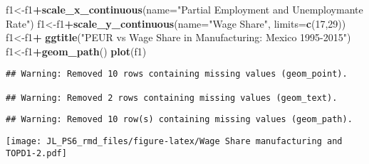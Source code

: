 \documentclass[
]{article}
\newenvironment{Shaded}{\begin{snugshade}}{\end{snugshade}}
\newcommand{\DataTypeTok}[1]{\textcolor[rgb]{0.13,0.29,0.53}{#1}}
\newcommand{\DecValTok}[1]{\textcolor[rgb]{0.00,0.00,0.81}{#1}}
\newcommand{\FloatTok}[1]{\textcolor[rgb]{0.00,0.00,0.81}{#1}}
\newcommand{\KeywordTok}[1]{\textcolor[rgb]{0.13,0.29,0.53}{\textbf{#1}}}
\newcommand{\NormalTok}[1]{#1}
\newcommand{\OperatorTok}[1]{\textcolor[rgb]{0.81,0.36,0.00}{\textbf{#1}}}
\newcommand{\StringTok}[1]{\textcolor[rgb]{0.31,0.60,0.02}{#1}}
\begin{document}
\begin{Shaded}
\begin{Highlighting}[]
\NormalTok{f1<-f1}\OperatorTok{+}\KeywordTok{scale_x_continuous}\NormalTok{(}\DataTypeTok{name=}\StringTok{"Partial Employment and Unemploymante Rate"}\NormalTok{)}
\NormalTok{f1<-f1}\OperatorTok{+}\KeywordTok{scale_y_continuous}\NormalTok{(}\DataTypeTok{name=}\StringTok{"Wage Share"}\NormalTok{, }\DataTypeTok{limits=}\KeywordTok{c}\NormalTok{(}\DecValTok{17}\NormalTok{,}\DecValTok{29}\NormalTok{))}
\NormalTok{f1<-f1}\OperatorTok{+}\StringTok{ }\KeywordTok{ggtitle}\NormalTok{(}\StringTok{"PEUR vs Wage Share in Manufacturing: Mexico 1995-2015"}\NormalTok{)}
\NormalTok{f1<-f1}\OperatorTok{+}\KeywordTok{geom_path}\NormalTok{()}
\KeywordTok{plot}\NormalTok{(f1)}
\end{Highlighting}
\end{Shaded}

\begin{verbatim}
## Warning: Removed 10 rows containing missing values (geom_point).

## Warning: Removed 2 rows containing missing values (geom_text).
\end{verbatim}

\begin{verbatim}
## Warning: Removed 10 row(s) containing missing values (geom_path).
\end{verbatim}

\texttt{[image: JL\_PS6\_rmd\_files/figure-latex/Wage Share manufacturing and TOPD1-2.pdf]}

\begin{Shaded}
\end{Shaded}
\end{document}
